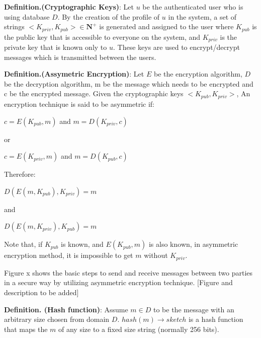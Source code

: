\textbf{Definition.(Cryptographic Keys)}: Let $u$ be the authenticated user who is using database $D$. By the creation of the profile of $u$ in the system, a set of strings $<K_{priv},K_{pub}> \in \mathbf{N}^+$ is generated and assigned to the user where $K_{pub}$ is the public key that is accessible to everyone on the system, and $K_{priv}$ is the private key that is known only to $u$. These keys are used to encrypt/decrypt messages which is transmitted between the users.


\textbf{Definition.(Assymetric Encryption)}: Let $E$ be the encryption algorithm, $D$ be the decryption algorithm, m be the message which needs to be encrypted and c be the encrypted message. Given the cryptographic keys $<K_{pub}, K_{priv}>$, An encryption technique is said to be asymmetric if:

\begin{center}
	$c = E(K_{pub},m)$ and  $m = D(K_{priv},c)$
\end{center}
or
\begin{center}
	$c = E(K_{priv},m)$ and  $m = D(K_{pub},c)$
\end{center}
Therefore:
\begin{center}
	$D(E(m,K_{pub}),K_{priv}) = m$ 
\end{center}
and
\begin{center}
	$D(E(m,K_{priv}),K_{pub}) = m$
\end{center}
Note that, if $K_{pub}$ is known, and $E(K_{pub},m)$ is also known, in asymmetric encryption method, it is impossible to get $m$ without $K_{priv}$.

Figure x shows the basic steps to send and receive messages between two parties in a secure way by utilizing asymmetric encryption technique. [Figure and description to be added]

\textbf{Definition. (Hash function)}: Assume $m \in D$ to be the message with an arbitrary size chosen from domain $D$. $hash(m)\rightarrow sketch$ 
is a hash function that maps the $m$ of any size to a fixed size string (normally 256 bits).


